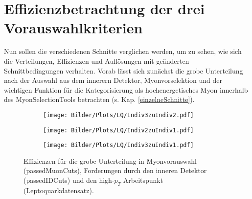 \section{Effizienzbetrachtung der drei Vorauswahlkriterien}\label{IDPreHigh}%
Nun sollen die verschiedenen Schnitte verglichen werden, um zu sehen, wie sich die Verteilungen, Effizienzen und Auflösungen mit geänderten Schnittbedingungen verhalten.
Vorab lässt sich zunächst die grobe Unterteilung nach der Auswahl aus dem innerern Detektor, Myonvorselektion und der wichtigen Funktion für die Kategorisierung als hochenergetisches Myon innerhalb des MyonSelectionTools betrachten (s. Kap. \ref{einzelneSchnitte}).\\ 
\begin{figure}
  \begin{subfigure}[t]{0.55\textwidth}
  \texttt{[image: Bilder/Plots/LQ/Indiv3zuIndiv2.pdf]}
  \label{Indiv3zuIndiv2}
  \end{subfigure}
\begin{subfigure}[t]{0.55\textwidth}
 \texttt{[image: Bilder/Plots/LQ/Indiv2zuIndiv1.pdf]}
  \label{Indiv2zuIndiv1}
\end{subfigure}
\begin{subfigure}[t]{0.55\textwidth}
  \texttt{[image: Bilder/Plots/LQ/Indiv3zuIndiv1.pdf]}
  \label{Indiv3zuIndiv1}
\end{subfigure}
\caption{Effizienzen für die grobe Unterteilung in Myonvorauswahl (passedMuonCuts), Forderungen durch den inneren Detektor (passedIDCuts) und den high-$p_T$ Arbeitspunkt (Leptoquarkdatensatz).}
\label{Vorselektion}
\end{figure}
